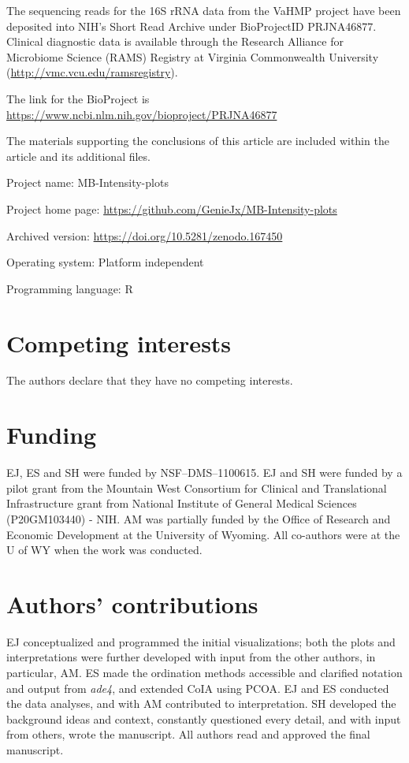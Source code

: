 \documentclass[doublespacing]{bmcart}
\begin{document}
\begin{backmatter}
The sequencing reads for the 16S rRNA data from the VaHMP project have been deposited into NIH's Short Read Archive under BioProjectID PRJNA46877. Clinical diagnostic data is available through the Research Alliance for Microbiome Science (RAMS) Registry at Virginia Commonwealth University (\url{http://vmc.vcu.edu/ramsregistry}).

The link for the BioProject is
\url{https://www.ncbi.nlm.nih.gov/bioproject/PRJNA46877}

The materials supporting the conclusions of this article are included within the article and its additional files.

Project name: MB-Intensity-plots

Project home page: \url{https://github.com/GenieJx/MB-Intensity-plots }

Archived version:  \url{https://doi.org/10.5281/zenodo.167450} 

Operating system: Platform independent

Programming language: R

\section*{Competing interests}
  The authors declare that they have no competing interests.


\section*{Funding}
EJ, ES and SH were funded by NSF--DMS--1100615. EJ and SH were funded by a pilot grant from the Mountain West Consortium for Clinical and Translational Infrastructure grant from
National Institute of General Medical Sciences (P20GM103440) - NIH.  AM was partially funded by the Office of Research and Economic Development at the University of Wyoming. All co-authors were at the U of WY when the work was conducted. 

\section*{Authors' contributions}
EJ conceptualized and programmed the initial visualizations; both the plots and interpretations were further developed with input from the other authors, in particular, AM. ES made the ordination methods accessible and clarified notation and output from \textit {ade4}, and extended CoIA using PCOA. EJ and ES conducted the data analyses, and with AM contributed to interpretation. SH developed the background ideas and context, constantly questioned every detail, and with input from others, wrote the manuscript. All authors read and approved the final manuscript.


\end{backmatter}
\end{document}
